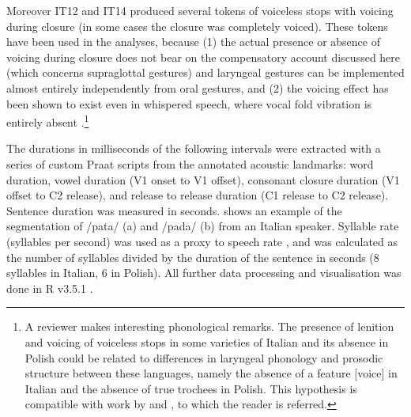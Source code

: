 \documentclass[charis]{glossa}
\begin{document}
Moreover IT12 and IT14 produced several tokens of voiceless stops with
voicing during closure (in some cases the closure was completely
voiced). These tokens have been used in the analyses, because (1) the
actual presence or absence of voicing during closure does not bear on
the compensatory account discussed here (which concerns supraglottal
gestures) and laryngeal gestures can be implemented almost entirely
independently from oral gestures, and (2) the voicing effect has been
shown to exist even in whispered speech, where vocal fold vibration is
entirely absent
\citep{sharf1964}.\footnote{A reviewer makes interesting phonological remarks. The presence of lenition and voicing of voiceless stops in some varieties of Italian and its absence in Polish could be related to differences in laryngeal phonology and prosodic structure between these languages, namely the absence of a feature [voice] in Italian and the absence of true trochees in Polish. This hypothesis is compatible with work by \citet{schwartz2018} and \citet{schwartz2016}, to which the reader is referred.}

The durations in milliseconds of the following intervals were extracted
with a series of custom Praat scripts from the annotated acoustic
landmarks: word duration, vowel duration (V1 onset to V1 offset),
consonant closure duration (V1 offset to C2 release), and release to
release duration (C1 release to C2 release). Sentence duration was
measured in seconds.  shows an example of the
segmentation of /pata/ (a) and /pada/ (b) from an Italian speaker.
Syllable rate (syllables per second) was used as a proxy to speech rate
\citep{plug2018a}, and was calculated as the number of syllables divided
by the duration of the sentence in seconds (8 syllables in Italian, 6 in
Polish). All further data processing and visualisation was done in R
v3.5.1 \citep{r-core-team2018, wickham2017}.
\end{document}
